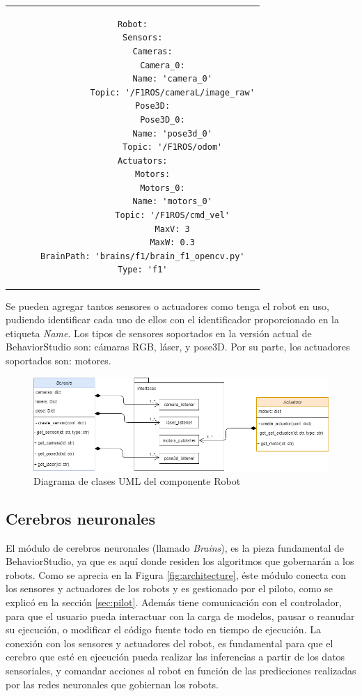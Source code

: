 \begin{tabular}{c}
\begin{lstlisting}[caption={Ejemplo de configuración en formato YAML},label=yml_rob]
Robot:
    Sensors:
        Cameras:
            Camera_0:
                Name: 'camera_0'
                Topic: '/F1ROS/cameraL/image_raw'
        Pose3D:
            Pose3D_0:
                Name: 'pose3d_0'
                Topic: '/F1ROS/odom'
    Actuators:
        Motors:
            Motors_0:
                Name: 'motors_0'
                Topic: '/F1ROS/cmd_vel'
                MaxV: 3
                MaxW: 0.3
    BrainPath: 'brains/f1/brain_f1_opencv.py'
    Type: 'f1'
\end{lstlisting}
\end{tabular}

Se pueden agregar tantos sensores o actuadores como tenga el robot en uso, pudiendo identificar cada uno de ellos con el identificador proporcionado en la etiqueta \textit{Name}. Los tipos de sensores soportados en la versión actual de BehaviorStudio son: cámaras RGB, láser, y pose3D. Por su parte, los actuadores soportados son: motores.

\begin{figure}
  \centering
  \includegraphics[width=1\linewidth]{img/robotuml}
  \caption{Diagrama de clases UML del componente Robot}
  \label{fig:robouml}
\end{figure}

\subsection{Cerebros neuronales}
\label{sec:brainnets}

El módulo de cerebros neuronales (llamado \textit{Brains}), es la pieza fundamental de BehaviorStudio, ya que es aquí donde residen los algoritmos que gobernarán a los robots. Como se aprecia en la Figura \ref{fig:architecture}, éste módulo conecta con los sensores y actuadores de los robots y es gestionado por el piloto, como se explicó en la sección \ref{sec:pilot}. Además tiene comunicación con el controlador, para que el usuario pueda interactuar con la carga de modelos, pausar o reanudar su ejecución, o modificar el código fuente todo en tiempo de ejecución. La conexión con los sensores y actuadores del robot, es fundamental para que el cerebro que esté en ejecución pueda realizar las inferencias a partir de los datos sensoriales, y comandar acciones al robot en función de las predicciones realizadas por las redes neuronales que gobiernan los robots.

